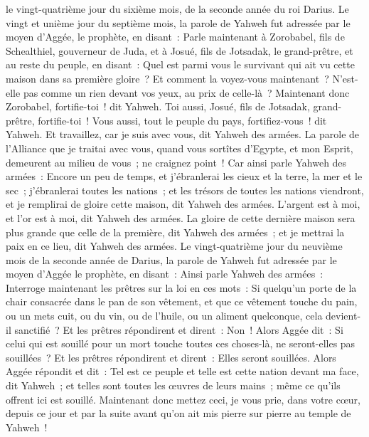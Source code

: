 \begin{multicols}{2}
le vingt-quatrième jour du sixième mois, de la seconde année du roi Darius.
\VerseOne{}Le vingt et unième jour du septième mois, la parole de Yahweh fut adressée par le moyen d'Aggée, le prophète, en disant~:
Parle maintenant à Zorobabel, fils de Schealthiel, gouverneur de Juda, et à Josué, fils de Jotsadak, le grand-prêtre, et au reste du peuple, en disant~:
Quel est parmi vous le survivant qui ait vu cette maison dans sa première gloire~? Et comment la voyez-vous maintenant~? N'est-elle pas comme un rien devant vos yeux, au prix de celle-là~?
Maintenant donc Zorobabel, fortifie-toi~! dit Yahweh. Toi aussi, Josué, fils de Jotsadak, grand-prêtre, fortifie-toi~! Vous aussi, tout le peuple du pays, fortifiez-vous~! dit Yahweh. Et travaillez, car je suis avec vous, dit Yahweh des armées.
La parole de l'Alliance que je traitai avec vous, quand vous sortîtes d'Egypte, et mon Esprit, demeurent au milieu de vous~; ne craignez point~!
Car ainsi parle Yahweh des armées~: Encore un peu de temps, et j'ébranlerai les cieux et la terre, la mer et le sec~;
j'ébranlerai toutes les nations~; et les trésors de toutes les nations viendront, et je remplirai de gloire cette maison, dit Yahweh des armées.
L'argent est à moi, et l'or est à moi, dit Yahweh des armées.
La gloire de cette dernière maison sera plus grande que celle de la première, dit Yahweh des armées~; et je mettrai la paix en ce lieu, dit Yahweh des armées.
Le vingt-quatrième jour du neuvième mois de la seconde année de Darius, la parole de Yahweh fut adressée par le moyen d'Aggée le prophète, en disant~:
Ainsi parle Yahweh des armées~: Interroge maintenant les prêtres sur la loi en ces mots~:
Si quelqu'un porte de la chair consacrée dans le pan de son vêtement, et que ce vêtement touche du pain, ou un mets cuit, ou du vin, ou de l'huile, ou un aliment quelconque, cela devient-il sanctifié~? Et les prêtres répondirent et dirent~: Non~!
Alors Aggée dit~: Si celui qui est souillé pour un mort touche toutes ces choses-là, ne seront-elles pas souillées~? Et les prêtres répondirent et dirent~: Elles seront souillées.
Alors Aggée répondit et dit~: Tel est ce peuple et telle est cette nation devant ma face, dit Yahweh~; et telles sont toutes les œuvres de leurs mains~; même ce qu'ils offrent ici est souillé.
Maintenant donc mettez ceci, je vous prie, dans votre cœur, depuis ce jour et par la suite avant qu'on ait mis pierre sur pierre au temple de Yahweh~!

\end{multicols}
